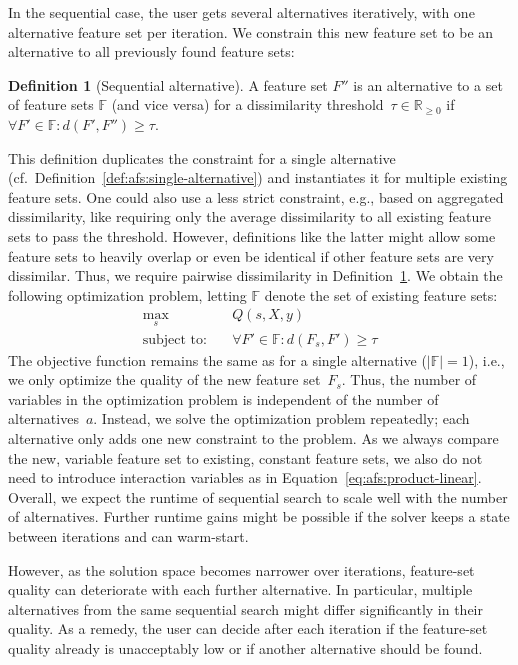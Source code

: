 \documentclass{article}
\theoremstyle{definition}
\newtheorem{definition}{Definition}
\begin{document}
In the sequential case, the user gets several alternatives iteratively, with one alternative feature set per iteration.
We constrain this new feature set to be an alternative to all previously found feature sets:
%
\begin{definition}[Sequential alternative]
	A feature set $F''$ is an alternative to a set of feature sets $\mathbb{F}$ (and vice versa) for a dissimilarity threshold~$\tau \in \mathbb{R}_{\geq 0}$ if $\forall F' \in \mathbb{F}: d(F',F'') \geq \tau$.
	\label{def:afs:sequential-alternative}
\end{definition}
%
This definition duplicates the constraint for a single alternative (cf.~Definition~\ref{def:afs:single-alternative}) and instantiates it for multiple existing feature sets.
One could also use a less strict constraint, e.g., based on aggregated dissimilarity, like requiring only the average dissimilarity to all existing feature sets to pass the threshold.
However, definitions like the latter might allow some feature sets to heavily overlap or even be identical if other feature sets are very dissimilar.
Thus, we require pairwise dissimilarity in Definition~\ref{def:afs:sequential-alternative}.
We obtain the following optimization problem, letting $\mathbb{F}$ denote the set of existing feature sets:
%
\begin{equation}
	\begin{aligned}
		\max_s &\quad Q(s,X,y) \\
		\text{subject to:} &\quad \forall F' \in \mathbb{F}: d(F_s,F') \geq \tau
	\end{aligned}
	\label{eq:afs:afs-sequential}
\end{equation}
%
The objective function remains the same as for a single alternative ($|\mathbb{F}| = 1$), i.e., we only optimize the quality of the new feature set~$F_s$.
Thus, the number of variables in the optimization problem is independent of the number of alternatives~$a$.
Instead, we solve the optimization problem repeatedly; each alternative only adds one new constraint to the problem.
As we always compare the new, variable feature set to existing, constant feature sets, we also do not need to introduce interaction variables as in Equation~\ref{eq:afs:product-linear}.
Overall, we expect the runtime of sequential search to scale well with the number of alternatives.
Further runtime gains might be possible if the solver keeps a state between iterations and can warm-start.

However, as the solution space becomes narrower over iterations, feature-set quality can deteriorate with each further alternative.
In particular, multiple alternatives from the same sequential search might differ significantly in their quality.
As a remedy, the user can decide after each iteration if the feature-set quality already is unacceptably low or if another alternative should be found.
\end{document}
